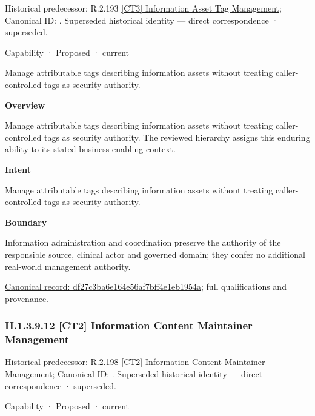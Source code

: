 {\small Historical predecessor: R.2.193 \hyperref[element:ae44a4ee78414d1098814315793bd751]{[CT3] Information Asset Tag Management}; Canonical ID: \texttt{}. Superseded historical identity — direct correspondence · superseded.}\par
\label{element:df27c3ba6e164e56af7bff4e1eb1954a}
{\small Capability · Proposed · current}\par

Manage attributable tags describing information assets without treating caller-controlled tags as security authority.



\textbf{Overview}



Manage attributable tags describing information assets without treating caller-controlled tags as security authority. The reviewed hierarchy assigns this enduring ability to its stated business-enabling context.



\textbf{Intent}



Manage attributable tags describing information assets without treating caller-controlled tags as security authority.



\textbf{Boundary}



Information administration and coordination preserve the authority of the responsible source, clinical actor and governed domain; they confer no additional real-world management authority.


{\footnotesize \href{../../../../continuum/strategy/capability/df27c3ba6e164e56af7bff4e1eb1954a.md}{Canonical record: df27c3ba6e164e56af7bff4e1eb1954a}; full qualifications and provenance.}\par
\subsubsection*{II.1.3.9.12 [CT2] Information Content Maintainer Management}
\label{navigation:II.1.3.9.12}

{\small Historical predecessor: R.2.198 \hyperref[element:acb977e879204f1491293e5452e0ddf0]{[CT2] Information Content Maintainer Management}; Canonical ID: \texttt{}. Superseded historical identity — direct correspondence · superseded.}\par
\label{element:b81a1ab42af24c2e9896b8f3f78d291a}
{\small Capability · Proposed · current}\par

